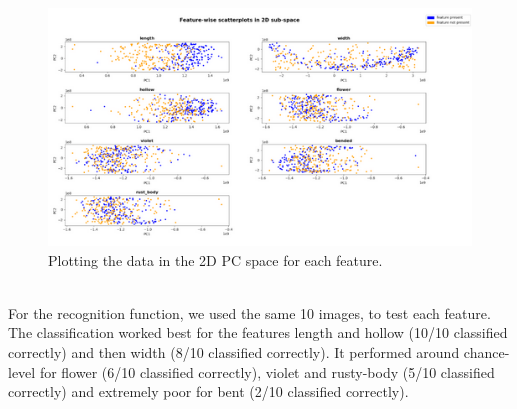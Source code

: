\begin{figure}[h]
	\centering
	\includegraphics[scale=0.8]{Figures/chapter04/pc_2dspace}
	\decoRule
	\caption[Featurewise scatterplot in 2D]{Plotting the data in the 2D PC space for each feature.}
	\label{fig:PrincipalComponent2DSpace}
\end{figure}
\\
For the recognition function, we used the same 10 images, to test each feature. The classification worked best for the features length and hollow (10/10 classified correctly) and then width (8/10 classified correctly). It performed around chance-level for flower (6/10 classified correctly), violet and rusty-body (5/10 classified correctly) and extremely poor for bent (2/10 classified correctly).  \\
\\
 
